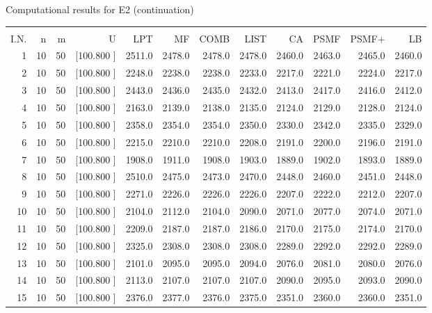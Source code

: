 \documentclass[12pt,a4paper]{article}
\begin{document}
\begin{center}
 Computational results for E2 (continuation) {\tiny
\begin{tabular}{r r r r r r r r r r r r}\hline
    &   &   &          &        &        &        &        &        &        &        &       \\[-0.1in]
  I.N.  &  n  &  m  &  U  &  LPT  &  MF  &  COMB  &  LIST  &  CA  & PSMF &PSMF+ & LB \\[0.03in]
\hline
   1& 10& 50&[100.800   ]&  2511.0&  2478.0&  2478.0&  2478.0&  2460.0&  2463.0&  2465.0&  2460.0\\[-0.02in]
   2& 10& 50&[100.800   ]&  2248.0&  2238.0&  2238.0&  2233.0&  2217.0&  2221.0&  2224.0&  2217.0\\[-0.02in]
   3& 10& 50&[100.800   ]&  2443.0&  2436.0&  2435.0&  2432.0&  2413.0&  2417.0&  2416.0&  2412.0\\[-0.02in]
   4& 10& 50&[100.800   ]&  2163.0&  2139.0&  2138.0&  2135.0&  2124.0&  2129.0&  2128.0&  2124.0\\[-0.02in]
   5& 10& 50&[100.800   ]&  2358.0&  2354.0&  2354.0&  2350.0&  2330.0&  2342.0&  2335.0&  2329.0\\[-0.02in]
   6& 10& 50&[100.800   ]&  2215.0&  2210.0&  2210.0&  2208.0&  2191.0&  2200.0&  2196.0&  2191.0\\[-0.02in]
   7& 10& 50&[100.800   ]&  1908.0&  1911.0&  1908.0&  1903.0&  1889.0&  1902.0&  1893.0&  1889.0\\[-0.02in]
   8& 10& 50&[100.800   ]&  2510.0&  2475.0&  2473.0&  2470.0&  2448.0&  2460.0&  2451.0&  2448.0\\[-0.02in]
   9& 10& 50&[100.800   ]&  2271.0&  2226.0&  2226.0&  2226.0&  2207.0&  2222.0&  2212.0&  2207.0\\[-0.02in]
  10& 10& 50&[100.800   ]&  2104.0&  2112.0&  2104.0&  2090.0&  2071.0&  2077.0&  2074.0&  2071.0\\[-0.02in]
  11& 10& 50&[100.800   ]&  2209.0&  2187.0&  2187.0&  2186.0&  2170.0&  2175.0&  2174.0&  2170.0\\[-0.02in]
  12& 10& 50&[100.800   ]&  2325.0&  2308.0&  2308.0&  2308.0&  2289.0&  2292.0&  2292.0&  2289.0\\[-0.02in]
  13& 10& 50&[100.800   ]&  2101.0&  2095.0&  2095.0&  2094.0&  2076.0&  2081.0&  2080.0&  2076.0\\[-0.02in]
  14& 10& 50&[100.800   ]&  2113.0&  2107.0&  2107.0&  2107.0&  2090.0&  2095.0&  2093.0&  2090.0\\[-0.02in]
  15& 10& 50&[100.800   ]&  2376.0&  2377.0&  2376.0&  2375.0&  2351.0&  2360.0&  2360.0&  2351.0\\[-0.02in]

\end{tabular}}
\end{center}
\end{document}
